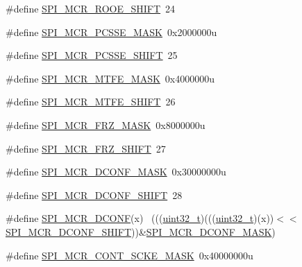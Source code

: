 \begin{DoxyCompactItemize}
\item 
\#define \hyperlink{group___s_p_i___register___masks_ga78f4dfaad41aae2ee10979f2e248e4d3}{S\+P\+I\+\_\+\+M\+C\+R\+\_\+\+R\+O\+O\+E\+\_\+\+S\+H\+I\+FT}~24
\item 
\#define \hyperlink{group___s_p_i___register___masks_ga479a7a3131d4356e53f7f86bd4cd0245}{S\+P\+I\+\_\+\+M\+C\+R\+\_\+\+P\+C\+S\+S\+E\+\_\+\+M\+A\+SK}~0x2000000u
\item 
\#define \hyperlink{group___s_p_i___register___masks_ga4dc49f49441cc797619c160757bd7d2d}{S\+P\+I\+\_\+\+M\+C\+R\+\_\+\+P\+C\+S\+S\+E\+\_\+\+S\+H\+I\+FT}~25
\item 
\#define \hyperlink{group___s_p_i___register___masks_ga3fa9d02b4302f9963c26383bdeb35da8}{S\+P\+I\+\_\+\+M\+C\+R\+\_\+\+M\+T\+F\+E\+\_\+\+M\+A\+SK}~0x4000000u
\item 
\#define \hyperlink{group___s_p_i___register___masks_gaaff9ea9fcaf46dc8bfd358d941e0d3ac}{S\+P\+I\+\_\+\+M\+C\+R\+\_\+\+M\+T\+F\+E\+\_\+\+S\+H\+I\+FT}~26
\item 
\#define \hyperlink{group___s_p_i___register___masks_ga6d4131c2e45352910d630723c1172d2c}{S\+P\+I\+\_\+\+M\+C\+R\+\_\+\+F\+R\+Z\+\_\+\+M\+A\+SK}~0x8000000u
\item 
\#define \hyperlink{group___s_p_i___register___masks_ga7500a54a21171d20a3bbf0355350c9bd}{S\+P\+I\+\_\+\+M\+C\+R\+\_\+\+F\+R\+Z\+\_\+\+S\+H\+I\+FT}~27
\item 
\#define \hyperlink{group___s_p_i___register___masks_gab6f80a07ce3be21ee0de56c3de90f380}{S\+P\+I\+\_\+\+M\+C\+R\+\_\+\+D\+C\+O\+N\+F\+\_\+\+M\+A\+SK}~0x30000000u
\item 
\#define \hyperlink{group___s_p_i___register___masks_ga5f84d391d6b5838c50b44217617d66a8}{S\+P\+I\+\_\+\+M\+C\+R\+\_\+\+D\+C\+O\+N\+F\+\_\+\+S\+H\+I\+FT}~28
\item 
\#define \hyperlink{group___s_p_i___register___masks_gaa402d5f6da9c9ba06834c77dba6eb9d9}{S\+P\+I\+\_\+\+M\+C\+R\+\_\+\+D\+C\+O\+NF}(x)                                              ~(((\hyperlink{_p_e___types_8h_a33594304e786b158f3fb30289278f5af}{uint32\+\_\+t})(((\hyperlink{_p_e___types_8h_a33594304e786b158f3fb30289278f5af}{uint32\+\_\+t})(x))$<$$<$\hyperlink{group___s_p_i___register___masks_ga5f84d391d6b5838c50b44217617d66a8}{S\+P\+I\+\_\+\+M\+C\+R\+\_\+\+D\+C\+O\+N\+F\+\_\+\+S\+H\+I\+FT}))\&\hyperlink{group___s_p_i___register___masks_gab6f80a07ce3be21ee0de56c3de90f380}{S\+P\+I\+\_\+\+M\+C\+R\+\_\+\+D\+C\+O\+N\+F\+\_\+\+M\+A\+SK})
\item 
\#define \hyperlink{group___s_p_i___register___masks_gad40a2cace787fe5eaaf74379ffb7cfc2}{S\+P\+I\+\_\+\+M\+C\+R\+\_\+\+C\+O\+N\+T\+\_\+\+S\+C\+K\+E\+\_\+\+M\+A\+SK}~0x40000000u
$$
\end{DoxyCompactItemize}
